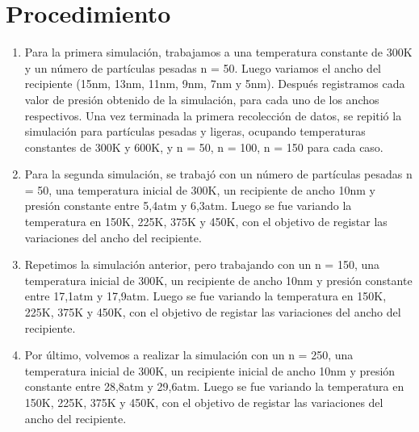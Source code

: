 \documentclass[]{article}
\begin{document}
\section{Procedimiento}
\begin{enumerate}
    \item Para la primera simulación, trabajamos a una temperatura constante de 300K y un número de partículas pesadas n = 50. Luego variamos el ancho del recipiente (15nm, 13nm, 11nm,
    9nm, 7nm y 5nm). Después registramos cada valor de presión obtenido de la simulación, para cada
    uno de los anchos respectivos.
    Una vez terminada la primera recolección de datos, se repitió la simulación para partículas pesadas y ligeras, ocupando temperaturas constantes de 300K y 600K, y n = 50, n = 100, n = 150
    para cada caso. 

    \item Para la segunda simulación, se trabajó con un número de partículas pesadas n = 50, una
    temperatura inicial de 300K, un recipiente de ancho 10nm  y presión constante entre 5,4atm y 6,3atm.
    Luego se fue variando la temperatura en 150K, 225K, 375K y 450K, con el objetivo de registar las variaciones del ancho del recipiente.
    

    \item   Repetimos la simulación anterior, pero trabajando con un n = 150,  una temperatura inicial de 300K,  un recipiente de ancho 10nm y presión constante entre 17,1atm y 17,9atm. 
    Luego se fue variando la temperatura en 150K, 225K, 375K y 450K, con el objetivo de registar las variaciones del ancho del recipiente. 
    
    \item  Por último, volvemos a realizar la simulación con un n = 250, una temperatura inicial de 300K, un
    recipiente inicial de ancho 10nm y presión constante entre 28,8atm y 29,6atm.
    Luego se fue variando la temperatura en 150K, 225K, 375K y 450K, con el objetivo de registar las variaciones del ancho del recipiente.
   
    
    
\end{enumerate}









\end{document}
